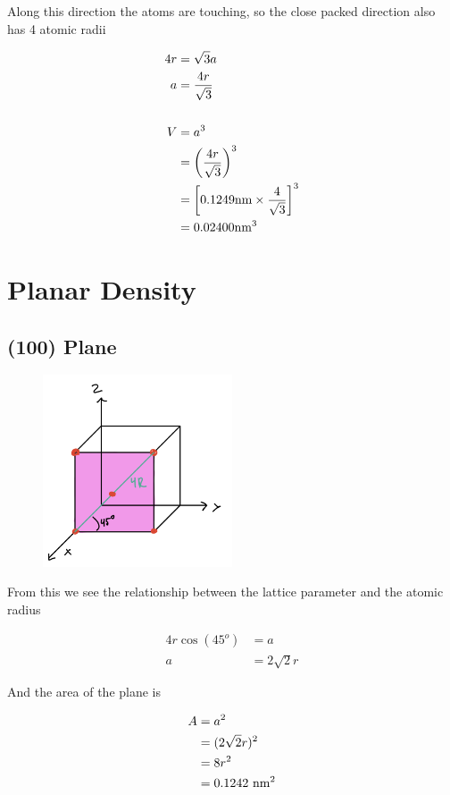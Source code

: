 \documentclass{article}
\begin{document}
Along this direction the atoms are touching, so the close packed direction also has 4 atomic radii

\begin{align*}
    4r &= \sqrt{3}a \\
    a &= \frac{4r}{\sqrt{3}} \\
    \vspace*{1em} \\
    V &= a^3 \\
    &= \left(\frac{4r}{\sqrt{3}}\right)^3 \\
    &= \left[ 0.1249 \textnormal{nm} \times \frac{4}{\sqrt{3}} \right]^{3} \\
    &= 0.02400 \textnormal{nm}^3
\end{align*}

\section{Planar Density}

\subsection*{(100) Plane}

\begin{figure}[H]
    \centering
    \includegraphics[width=0.5\textwidth]{100.png}
\end{figure}
\indent

From this we see the relationship between the lattice parameter and the atomic radius

\begin{align*}
    4r \cos(45^o) &= a \\
    a &= 2 \sqrt{2} r 
\end{align*}

And the area of the plane is 

\begin{align*}
    A &= a^2 \\
    &= (2 \sqrt{2} r)^2 \\
    &= 8r^2 \\
    &= 0.1242 \ \textnormal{nm}^2
\end{align*}
\end{document}
